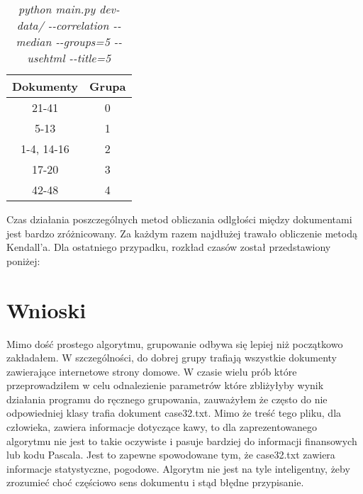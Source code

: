 \documentclass{article}
\begin{document}
\begin{table}[H]
\begin{center}
\begin{tabular}{ | c | c | }
\hline
Dokumenty & Grupa \\ \hline
21-41 & 0 \\ \hline
5-13 & 1 \\ \hline
1-4, 14-16 & 2 \\ \hline
17-20 & 3 \\ \hline
42-48 & 4 \\ \hline
\end{tabular}
\caption{\emph{python main.py dev-data/ -{}-correlation -{}-median -{}-groups=5 -{}-usehtml -{}-title=5}}
\end{center}
\end{table}

Czas działania poszczególnych metod obliczania odlgłości między dokumentami jest bardzo zróżnicowany. Za każdym razem najdłużej trawało obliczenie metodą Kendall'a. Dla ostatniego przypadku, rozkład czasów został przedstawiony poniżej:

\begin{center}
\end{center}

\section{Wnioski}
Mimo dość prostego algorytmu, grupowanie odbywa się lepiej niż początkowo zakładałem. W szczególności, do dobrej grupy trafiają wszystkie dokumenty zawierające internetowe strony domowe. W czasie wielu prób które przeprowadziłem w celu odnalezienie parametrów które zbliżyłyby wynik działania programu do ręcznego grupowania, zauważyłem że często do nie odpowiedniej klasy trafia dokument case32.txt. Mimo że treść tego pliku, dla człowieka, zawiera informacje dotyczące kawy, to dla zaprezentowanego algorytmu nie jest to takie oczywiste i pasuje bardziej do informacji finansowych lub kodu Pascala. Jest to zapewne spowodowane tym, że case32.txt zawiera informacje statystyczne, pogodowe. Algorytm nie jest na tyle inteligentny, żeby zrozumieć choć częściowo sens dokumentu i stąd błędne przypisanie.
\end{document}
